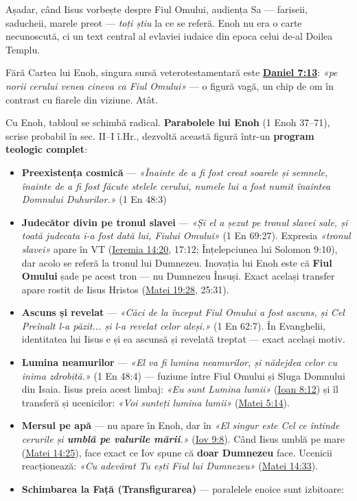 \documentclass[12pt,a4paper,twoside,openany]{book}
\begin{document}
Așadar, când Iisus vorbește despre Fiul Omului, audiența Sa — fariseii, saducheii, marele preot — \textit{toți știu} la ce se referă. Enoh nu era o carte necunoscută, ci un text central al evlaviei iudaice din epoca celui de-al Doilea Templu.

Fără Cartea lui Enoh, singura sursă veterotestamentară este \textbf{\href{https://bibliaortodoxa.ro/carte.php?id=16\&cap=7\#13}{Daniel 7:13}}: \textit{«pe norii cerului venea cineva ca Fiul Omului»} — o figură vagă, un chip de om în contrast cu fiarele din viziune. Atât.

Cu Enoh, tabloul se schimbă radical. \textbf{Parabolele lui Enoh} (1 Enoh 37–71), scrise probabil în sec. II–I î.Hr., dezvoltă această figură într-un \textbf{program teologic complet}:

\begin{itemize}
  \item \textbf{Preexistența cosmică} — \textit{«Înainte de a fi fost creat soarele și semnele, înainte de a fi fost făcute stelele cerului, numele lui a fost numit înaintea Domnului Duhurilor.»} (1 En 48:3)
  \item \textbf{Judecător divin pe tronul slavei} — \textit{«Și el a șezut pe tronul slavei sale, și toată judecata i-a fost dată lui, Fiului Omului»} (1 En 69:27). Expresia \textit{«tronul slavei»} apare în VT (\href{https://bibliaortodoxa.ro/carte.php?id=31\&cap=14\#20}{Ieremia 14:20}, 17:12; Înțelepciunea lui Solomon 9:10), dar acolo se referă la tronul lui Dumnezeu. Inovația lui Enoh este că \textbf{Fiul Omului} șade pe acest tron — nu Dumnezeu Însuși. Exact același transfer apare rostit de Iisus Hristos (\href{https://bibliaortodoxa.ro/carte.php?id=55\&cap=19\#28}{Matei 19:28}, 25:31).
  \item \textbf{Ascuns și revelat} — \textit{«Căci de la început Fiul Omului a fost ascuns, și Cel Preînalt l-a păzit... și l-a revelat celor aleși.»} (1 En 62:7). În Evanghelii, identitatea lui Iisus e și ea ascunsă și revelată treptat — exact același motiv.
  \item \textbf{Lumina neamurilor} — \textit{«El va fi lumina neamurilor, și nădejdea celor cu inima zdrobită.»} (1 En 48:4) — fuziune între Fiul Omului și Sluga Domnului din Isaia. Iisus preia acest limbaj: \textit{«Eu sunt Lumina lumii»} (\href{https://bibliaortodoxa.ro/carte.php?id=35\&cap=8\#12}{Ioan 8:12}) și îl transferă și ucenicilor: \textit{«Voi sunteți lumina lumii»} (\href{https://bibliaortodoxa.ro/carte.php?id=55\&cap=5\#14}{Matei 5:14}).
  \item \textbf{Mersul pe apă} — nu apare în Enoh, dar în \textit{«El singur este Cel ce întinde cerurile și \textbf{umblă pe valurile mării}.»} (\href{https://bibliaortodoxa.ro/carte.php?id=42\&cap=9\#8}{Iov 9:8}). Când Iisus umblă pe mare (\href{https://bibliaortodoxa.ro/carte.php?id=55\&cap=14\#25}{Matei 14:25}), face exact ce Iov spune că \textbf{doar Dumnezeu} face. Ucenicii reacționează: \textit{«Cu adevărat Tu ești Fiul lui Dumnezeu»} (\href{https://bibliaortodoxa.ro/carte.php?id=55\&cap=14\#33}{Matei 14:33}).
\item \textbf{Schimbarea la Față (Transfigurarea)} — paralelele enoice sunt izbitoare:


\end{itemize}
\end{document}

